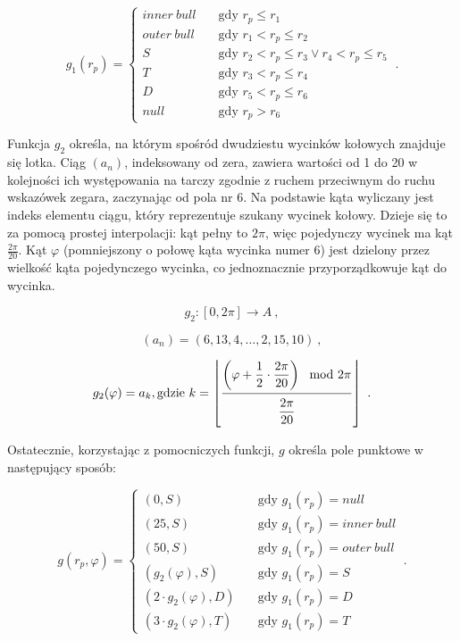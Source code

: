 \[
g_1(r_p) = 
     \begin{cases}
       inner\ bull &\quad\text{gdy } r_p \le r_1 \\
       outer\ bull &\quad\text{gdy } r_1 < r_p \le r_2 \\
       S &\quad\text{gdy } r_2 < r_p \le r_3 \lor r_4 < r_p \le r_5 \\
       T &\quad\text{gdy } r_3 < r_p \le r_4 \\
       D &\quad\text{gdy } r_5 < r_p \le r_6 \\
       null &\quad\text{gdy } r_p > r_6
     \end{cases}\ .
\]

Funkcja $g_2$ określa, na którym spośród dwudziestu wycinków kołowych znajduje się lotka. Ciąg $(a_n)$, indeksowany od zera, zawiera wartości od 1 do 20 w kolejności ich występowania na tarczy zgodnie z ruchem przeciwnym do ruchu wskazówek zegara, zaczynając od pola nr 6. Na podstawie kąta wyliczany jest indeks elementu ciągu, który reprezentuje szukany wycinek kołowy. Dzieje się to za pomocą prostej interpolacji: kąt pełny to $2\pi$, więc pojedynczy wycinek ma kąt $\frac{2\pi}{20}$. Kąt $\varphi$ (pomniejszony o połowę kąta wycinka numer 6) jest dzielony przez wielkość kąta pojedynczego wycinka, co jednoznacznie przyporządkowuje kąt do wycinka.

\[
g_2: [0, 2\pi] \to A\ ,
\]

\[
(a_n) = (6, 13, 4, \ldots, 2, 15, 10)\ ,
\]

\[
g_2(\varphi) = a_k, \mbox{gdzie } k = \left \lfloor{\myfrac[8pt]{\displaystyle \left(\varphi + \frac{1}{2} \cdot \frac{2\pi}{20}\right) \mod 2\pi}{\displaystyle \frac{2\pi}{20}}}\right \rfloor\ .
\]

Ostatecznie, korzystając z pomocniczych funkcji, $g$ określa pole punktowe w następujący sposób:

\[
g(r_p, \varphi) = 
     \begin{cases}
       (0, S) &\quad\text{gdy } g_1(r_p) = null \\
       (25, S) &\quad\text{gdy } g_1(r_p) = inner\ bull \\
       (50, S) &\quad\text{gdy } g_1(r_p) = outer\ bull \\
       (g_2(\varphi), S) &\quad\text{gdy } g_1(r_p) = S \\
       (2 \cdot g_2(\varphi), D) &\quad\text{gdy } g_1(r_p) = D \\
       (3 \cdot g_2(\varphi), T) &\quad\text{gdy } g_1(r_p) = T
     \end{cases}\ .
\]
\begin{figure}[h!]
\begin{center}

\end{center}
\label{tarcza_promienie}
\end{figure} 
